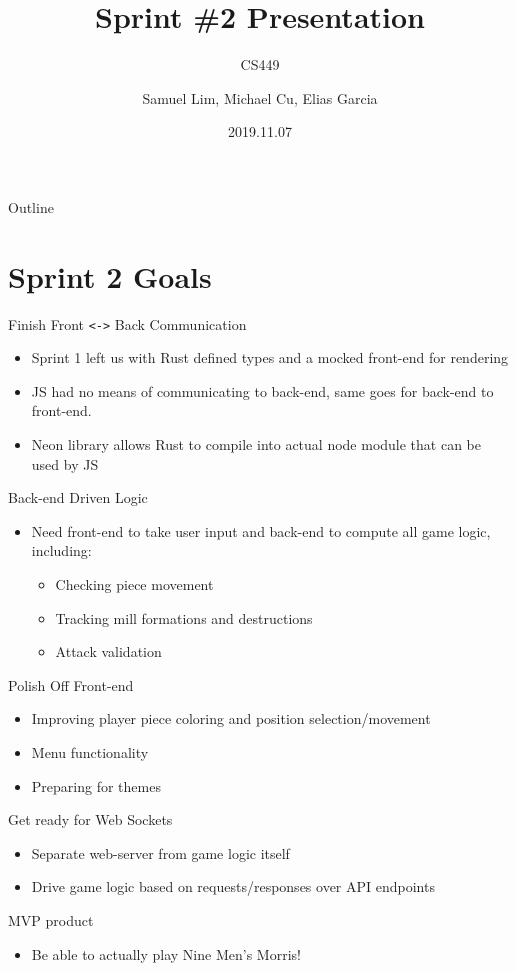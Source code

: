 \documentclass[allowframebreaks]{beamer}
\author{Samuel Lim, Michael Cu, Elias Garcia}
\date{2019.11.07}
\title{Sprint \#2 Presentation}
\subtitle{CS449}
\begin{document}
\maketitle
\begin{frame}{Outline}
\tableofcontents
\end{frame}

\section{Sprint 2 Goals}
\label{sec:orgd864859}
\begin{frame}[fragile,label={sec:orgde06252}]{Finish Front \texttt{<->} Back Communication}
 \begin{itemize}
\item Sprint 1 left us with Rust defined types and a mocked front-end for rendering
\item JS had no means of communicating to back-end, same goes for back-end to front-end.
\item Neon library allows Rust to compile into actual node module that can be used by JS
\end{itemize}
\end{frame}
\begin{frame}[label={sec:orged55428}]{Back-end Driven Logic}
\begin{itemize}
\item Need front-end to take user input and back-end to compute all game logic, including:
\begin{itemize}
\item Checking piece movement
\item Tracking mill formations and destructions
\item Attack validation
\end{itemize}
\end{itemize}
\end{frame}
\begin{frame}[label={sec:org894fc0a}]{Polish Off Front-end}
\begin{itemize}
\item Improving player piece coloring and position selection/movement
\item Menu functionality
\item Preparing for themes
\end{itemize}
\end{frame}
\begin{frame}[label={sec:org8a730ca}]{Get ready for Web Sockets}
\begin{itemize}
\item Separate web-server from game logic itself
\item Drive game logic based on requests/responses over API endpoints
\end{itemize}
\end{frame}
\begin{frame}[label={sec:org570b0dc}]{MVP product}
\begin{itemize}
\item Be able to actually play Nine Men's Morris!
\end{itemize}
\end{frame}
\end{document}
